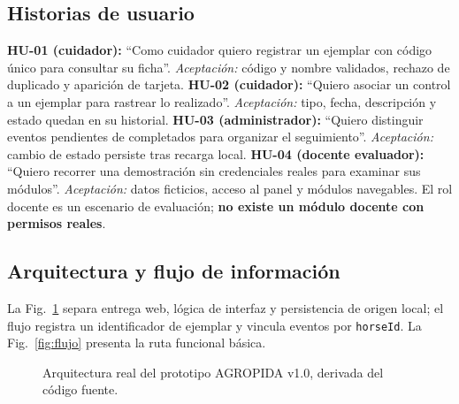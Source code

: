 \documentclass[conference,10pt]{IEEEtran}
\begin{document}
\subsection{Historias de usuario}
\textbf{HU-01 (cuidador):} ``Como cuidador quiero registrar un ejemplar con código único para consultar su ficha''. \emph{Aceptación:} código y nombre validados, rechazo de duplicado y aparición de tarjeta. \textbf{HU-02 (cuidador):} ``Quiero asociar un control a un ejemplar para rastrear lo realizado''. \emph{Aceptación:} tipo, fecha, descripción y estado quedan en su historial. \textbf{HU-03 (administrador):} ``Quiero distinguir eventos pendientes de completados para organizar el seguimiento''. \emph{Aceptación:} cambio de estado persiste tras recarga local. \textbf{HU-04 (docente evaluador):} ``Quiero recorrer una demostración sin credenciales reales para examinar sus módulos''. \emph{Aceptación:} datos ficticios, acceso al panel y módulos navegables. El rol docente es un escenario de evaluación; \textbf{no existe un módulo docente con permisos reales}.

\subsection{Arquitectura y flujo de información}
La Fig.~\ref{fig:arquitectura} separa entrega web, lógica de interfaz y persistencia de origen local; el flujo registra un identificador de ejemplar y vincula eventos por \texttt{horseId}. La Fig.~\ref{fig:flujo} presenta la ruta funcional básica.

\begin{figure}[!t]
\centering
{}
\caption{Arquitectura real del prototipo AGROPIDA v1.0, derivada del código fuente.}
\label{fig:arquitectura}
\end{figure}
\end{document}
